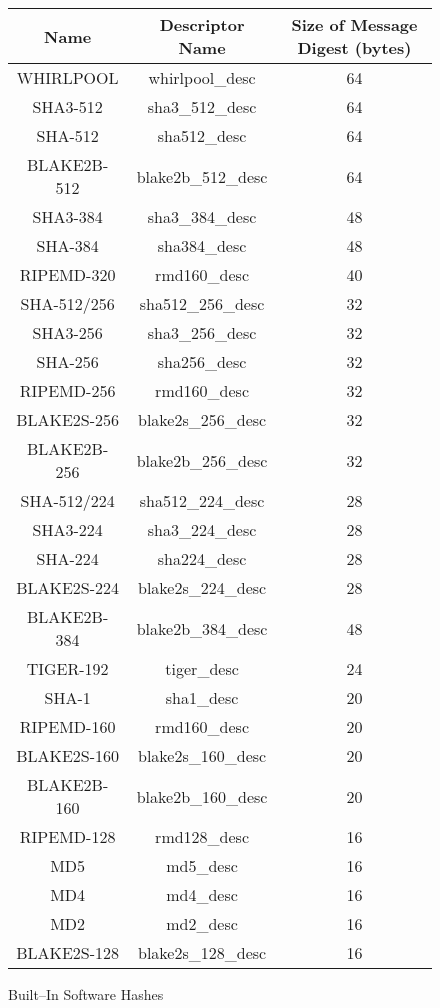 \documentclass[synpaper]{book}
\begin{document}
\begin{figure}[H]
\begin{center}
\begin{tabular}{|c|c|c|}
      \hline \textbf{Name} & \textbf{Descriptor Name} & \textbf{Size of Message Digest (bytes)} \\
      \hline WHIRLPOOL & whirlpool\_desc & 64 \\
      \hline SHA3-512 & sha3\_512\_desc & 64 \\
      \hline SHA-512 & sha512\_desc & 64 \\
      \hline BLAKE2B-512 & blake2b\_512\_desc & 64 \\
      \hline SHA3-384 & sha3\_384\_desc & 48 \\
      \hline SHA-384 & sha384\_desc & 48 \\
      \hline RIPEMD-320 & rmd160\_desc & 40 \\
      \hline SHA-512/256 & sha512\_256\_desc & 32 \\
      \hline SHA3-256 & sha3\_256\_desc & 32 \\
      \hline SHA-256 & sha256\_desc & 32 \\
      \hline RIPEMD-256 & rmd160\_desc & 32 \\
      \hline BLAKE2S-256 & blake2s\_256\_desc & 32 \\
      \hline BLAKE2B-256 & blake2b\_256\_desc & 32 \\
      \hline SHA-512/224 & sha512\_224\_desc & 28 \\
      \hline SHA3-224 & sha3\_224\_desc & 28 \\
      \hline SHA-224 & sha224\_desc & 28 \\
      \hline BLAKE2S-224 & blake2s\_224\_desc & 28 \\
      \hline BLAKE2B-384 & blake2b\_384\_desc & 48 \\
      \hline TIGER-192 & tiger\_desc & 24 \\
      \hline SHA-1 & sha1\_desc & 20 \\
      \hline RIPEMD-160 & rmd160\_desc & 20 \\
      \hline BLAKE2S-160 & blake2s\_160\_desc & 20 \\
      \hline BLAKE2B-160 & blake2b\_160\_desc & 20 \\
      \hline RIPEMD-128 & rmd128\_desc & 16 \\
      \hline MD5 & md5\_desc & 16 \\
      \hline MD4 & md4\_desc & 16 \\
      \hline MD2 & md2\_desc & 16 \\
      \hline BLAKE2S-128 & blake2s\_128\_desc & 16 \\
      \hline
\end{tabular}
\end{center}
\caption{Built--In Software Hashes}
\end{figure}
\vfil
\end{document}
